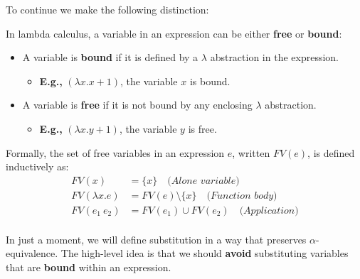 \noindent
To continue we make the following distinction:
\begin{Def}

    In lambda calculus, a variable in an expression can be either \textbf{free} or \textbf{bound}:
    
    \begin{itemize}
      \item A variable is \textbf{bound} if it is defined by a $\lambda$ abstraction in the expression. 
      \begin{itemize}
        \item \textbf{E.g.,} $(\lambda x. x + 1)$, the variable $x$ is bound.
      \end{itemize}
      \item A variable is \textbf{free} if it is not bound by any enclosing $\lambda$ abstraction.
        \begin{itemize}
            \item \textbf{E.g.,} $(\lambda x. y + 1)$, the variable $y$ is free.
        \end{itemize} 
    \end{itemize}
    
    \noindent
    Formally, the set of free variables in an expression $e$, written $\mathit{FV}(e)$, is defined inductively as:
    \[
    \begin{aligned}
      \mathit{FV}(x) & = \{x\} \quad \textit{(Alone variable)} \\
      \mathit{FV}(\lambda x. e) & = \mathit{FV}(e) \setminus \{x\} \quad \textit{(Function body)}\\
      \mathit{FV}(e_1\ e_2) & = \mathit{FV}(e_1) \cup \mathit{FV}(e_2) \quad \textit{(Application)}\\
    \end{aligned}
    \]
    

    \end{Def}



    \noindent
    In just a moment, we will define substitution in a way that preserves $\alpha$-equivalence. 
    The high-level idea is that we should \textbf{avoid} substituting variables that are \textbf{bound} within an expression.
    
\newpage

